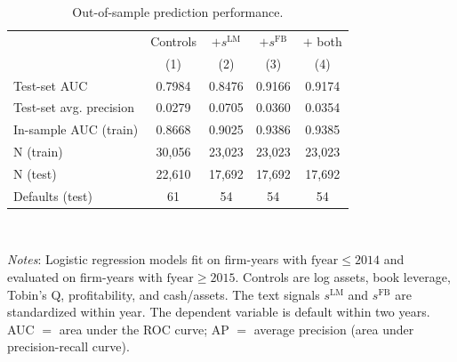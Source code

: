 \begin{table}[htbp]
\centering
\caption{Out-of-sample prediction performance.}
\label{tab:t8_oos}
\small
\begin{tabular}{lcccc}
\toprule
 & Controls & $+ s^{\mathrm{LM}}$ & $+ s^{\mathrm{FB}}$ & $+$ both \\
 & (1) & (2) & (3) & (4) \\
\midrule
Test-set AUC & 0.7984 & 0.8476 & 0.9166 & 0.9174 \\
Test-set avg. precision & 0.0279 & 0.0705 & 0.0360 & 0.0354 \\
In-sample AUC (train) & 0.8668 & 0.9025 & 0.9386 & 0.9385 \\
\midrule
N (train) & 30,056 & 23,023 & 23,023 & 23,023 \\
N (test) & 22,610 & 17,692 & 17,692 & 17,692 \\
Defaults (test) & 61 & 54 & 54 & 54 \\
\bottomrule
\end{tabular}
\\[-2ex]
\begin{flushleft}
\footnotesize
\textit{Notes}: Logistic regression models fit on firm-years with $\text{fyear} \le 2014$ and evaluated on firm-years with $\text{fyear} \ge 2015$. Controls are log assets, book leverage, Tobin's Q, profitability, and cash/assets. The text signals $s^{\mathrm{LM}}$ and $s^{\mathrm{FB}}$ are standardized within year. The dependent variable is default within two years. AUC $=$ area under the ROC curve; AP $=$ average precision (area under precision-recall curve).
\end{flushleft}
\end{table}